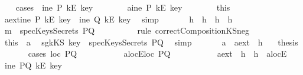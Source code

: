 \begin{isabellebody}
\ \ \isamarkupfalse%
\ {\isacharparenleft}cases\ \ {\isachardoublequoteopen}ine\ P\ {\isacharparenleft}kE\ key{\isacharparenright}{\isachardoublequoteclose}{\isacharparenright}\ \isanewline
\ \ \ \ \ \isamarkupfalse%
\ a{}{}{\isacharcolon}{\isachardoublequoteopen}ine\ P\ {\isacharparenleft}kE\ key{\isacharparenright}{\isachardoublequoteclose}\ \isanewline
\ \ \ \ \ \isamarkupfalse%
\ this\ \isamarkupfalse%
\ a{}{}ext{\isacharcolon}{\isachardoublequoteopen}ine\ P\ {\isacharparenleft}kE\ key{\isacharparenright}\ {\isacharbar}\ ine\ Q\ {\isacharparenleft}kE\ key{\isacharparenright}{\isachardoublequoteclose}\ \isamarkupfalse%
\ simp\isanewline
\ \ \ \ \ \isamarkupfalse%
\ h{}\ \ h{}\ \ h{}\ \ h{}\ \isamarkupfalse%
\ {\isachardoublequoteopen}m\ {\isasymnotin}\ specKeysSecrets\ PQ{\isachardoublequoteclose}\ \isanewline
\ \ \ \ \ \ \ \isamarkupfalse%
\ {\isacharparenleft}rule\ correctCompositionKS{\isacharunderscore}neg{}{\isacharparenright}\ \isanewline
\ \ \ \ \ \isamarkupfalse%
\ this\ \ a{}\ \isamarkupfalse%
\ sg{}{\isacharcolon}{\isachardoublequoteopen}kKS\ key\ {\isasymnotin}\ specKeysSecrets\ PQ{\isachardoublequoteclose}\ \isamarkupfalse%
\ simp\isanewline
\ \ \ \ \ \isamarkupfalse%
\ a{}\ \ a{}{}ext\ \ h{}\ \ \isamarkupfalse%
\ {\isacharquery}thesis\isanewline
\ \ \ \ \ \isamarkupfalse%
\ {\isacharparenleft}cases\ {\isachardoublequoteopen}loc\ PQ\ {\isacharequal}\ {\isacharbraceleft}{\isacharbraceright}{\isachardoublequoteclose}{\isacharparenright}\isanewline
\ \ \ \ \ \ \ \isamarkupfalse%
\ a{}{}locE{\isacharcolon}{\isachardoublequoteopen}loc\ PQ\ {\isacharequal}\ {\isacharbraceleft}{\isacharbraceright}{\isachardoublequoteclose}\isanewline
\ \ \ \ \ \ \ \isamarkupfalse%
\ a{}{}ext\ \ h{}\ \ h{}\ \ a{}{}locE\ \isamarkupfalse%
\ {\isachardoublequoteopen}ine\ PQ\ {\isacharparenleft}kE\ key{\isacharparenright}{\isachardoublequoteclose}\ \isanewline
\ \ \ \ \ \ \ \ \ \isamarkupfalse%

\end{isabellebody}

